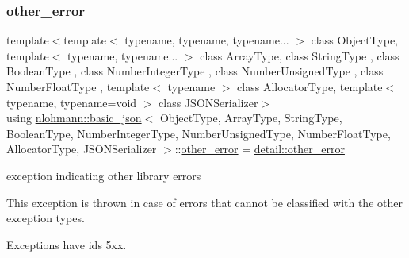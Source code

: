 \subsubsection{\texorpdfstring{other\+\_\+error}{other\_error}}
{\footnotesize\ttfamily template$<$template$<$ typename, typename, typename... $>$ class Object\+Type, template$<$ typename, typename... $>$ class Array\+Type, class String\+Type , class Boolean\+Type , class Number\+Integer\+Type , class Number\+Unsigned\+Type , class Number\+Float\+Type , template$<$ typename $>$ class Allocator\+Type, template$<$ typename, typename=void $>$ class J\+S\+O\+N\+Serializer$>$ \\
using \hyperlink{classnlohmann_1_1basic__json}{nlohmann\+::basic\+\_\+json}$<$ Object\+Type, Array\+Type, String\+Type, Boolean\+Type, Number\+Integer\+Type, Number\+Unsigned\+Type, Number\+Float\+Type, Allocator\+Type, J\+S\+O\+N\+Serializer $>$\+::\hyperlink{classnlohmann_1_1basic__json_a3333a5a8714912adda33a35b369f7b3d}{other\+\_\+error} =  \hyperlink{classnlohmann_1_1detail_1_1other__error}{detail\+::other\+\_\+error}}



exception indicating other library errors 

This exception is thrown in case of errors that cannot be classified with the other exception types.

Exceptions have ids 5xx.

